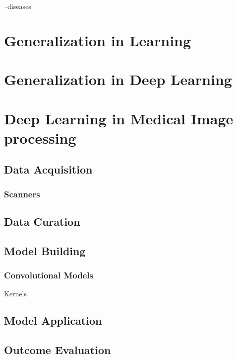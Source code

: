 --diseases



\section{Generalization in Learning}

\section{Generalization in Deep Learning}

\section{Deep Learning in Medical Image processing}
    \subsection{Data Acquisition}
        \subsubsection{Scanners}

    \subsection{Data Curation}
    \subsection{Model Building}
        \subsubsection{Convolutional Models}
            Kernels

    \subsection{Model Application}

    \subsection{Outcome Evaluation}
